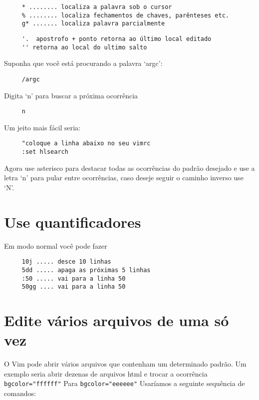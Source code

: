 \begin{verbatim}
     * ........ localiza a palavra sob o cursor
     % ........ localiza fechamentos de chaves, parênteses etc.
     g* ....... localiza palavra parcialmente
\end{verbatim}

\begin{verbatim}
     '.  apostrofo + ponto retorna ao último local editado
     '' retorna ao local do ultimo salto
\end{verbatim}

Suponha que você está procurando a palavra `argc':

\begin{verbatim}
     /argc
\end{verbatim}

Digita `n' para buscar a próxima ocorrência

\begin{verbatim}
     n
\end{verbatim}

Um jeito mais fácil seria:

\begin{verbatim}
     "coloque a linha abaixo no seu vimrc
     :set hlsearch
\end{verbatim}

Agora use asterisco para destacar todas as ocorrências do padrão desejado
e use a letra `n' para pular entre ocorrências, caso deseje seguir o caminho
inverso use `N'.

\section{Use quantificadores}
\label{Use quantificadores}
Em modo normal você pode fazer

\begin{verbatim}
     10j ..... desce 10 linhas
     5dd ..... apaga as próximas 5 linhas
     :50 ..... vai para a linha 50
     50gg .... vai para a linha 50
\end{verbatim}


\section{Edite vários arquivos de uma só vez }
\label{Edite vários arquivos de uma só vez }

O Vim pode abrir vários arquivos que contenham um determinado padrão.
Um exemplo seria abrir dezenas de arquivos html e trocar a ocorrência
\verb+bgcolor="ffffff"+ Para \verb+bgcolor="eeeeee"+ Usaríamos a seguinte 
sequência de comandos:

